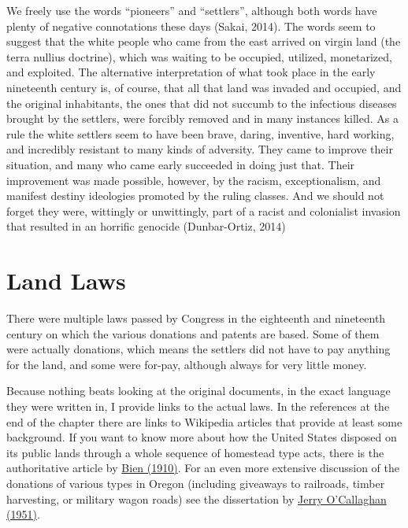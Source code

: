 \documentclass[
  12pt,
]{book}
\begin{document}
We freely use the words ``pioneers'' and ``settlers'', although both words have plenty of negative connotations these days (Sakai, 2014). The words seem to suggest that the white people who came from the east arrived on virgin land (the terra nullius doctrine), which was waiting to be occupied, utilized, monetarized, and exploited. The alternative interpretation of what took place in the early nineteenth century is, of course, that all that land was invaded and occupied, and the original inhabitants, the ones that did not succumb to the infectious diseases brought by the settlers, were forcibly removed and in many instances killed. As a rule the white settlers seem to have been brave, daring, inventive, hard working, and incredibly resistant to many kinds of adversity. They came to improve their situation, and many who came early succeeded in doing just that. Their improvement was made possible, however, by the racism, exceptionalism, and manifest destiny ideologies promoted by the ruling classes. And we should not forget they were, wittingly or unwittingly, part of a racist and colonialist invasion that resulted in an horrific genocide (Dunbar-Ortiz, 2014)

\hypertarget{land-laws}{%
\section{Land Laws}\label{land-laws}}

There were multiple laws passed by Congress in the eighteenth and nineteenth century on which the various donations and patents are based. Some of them were actually donations, which means the settlers did not have to pay anything for the land, and some were for-pay, although always for very little money.

Because nothing beats looking at the original documents, in the exact language they were written in, I provide links to the actual laws. In the references at the end of the chapter there are links to Wikipedia articles that provide at least some background. If you want to know more about how the United States disposed on its public lands through a whole sequence of homestead type acts, there is the authoritative article by \href{https://drive.google.com/file/d/1TT_lgoh_nI8LSdztGw_claFQYfHje16G}{Bien (1910)}. For an even more extensive discussion of the donations of various types in Oregon (including giveaways to railroads, timber harvesting, or military wagon roads) see the dissertation by \href{https://drive.google.com/file/d/1T8HRj39qobQ_4NkydJpagwnRQvFPAEUB}{Jerry O'Callaghan (1951)}.
\end{document}
